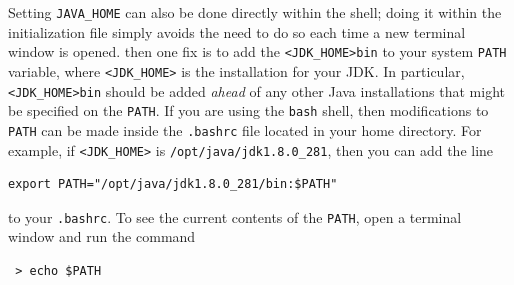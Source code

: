Setting {\tt JAVA\_HOME} can also be done directly within the shell;
doing it within the initialization file simply avoids the need to do
so each time a new terminal window is opened.
\fi
\ifLinux
then one fix is to add the \directory{} {\tt <JDK\_HOME>\SEP bin} to
your system {\tt PATH} variable, where {\tt <JDK\_HOME>} is the
installation \directory{} for your JDK.  In particular, {\tt
<JDK\_HOME>\SEP bin} should be added {\it ahead} of any other Java
installations that might be specified on the {\tt PATH}.  If you are
using the {\tt bash} shell, then modifications to {\tt PATH} can be
made inside the {\tt .bashrc} file located in your home directory.
For example, if {\tt <JDK\_HOME>} is {\tt /opt/java/jdk1.8.0\_281},
then you can add the line
\begin{verbatim}
export PATH="/opt/java/jdk1.8.0_281/bin:$PATH"
\end{verbatim}
to your {\tt .bashrc}. To see the current contents of the {\tt PATH},
open a terminal window and run the command
\begin{verbatim}
 > echo $PATH
\end{verbatim}
\fi


